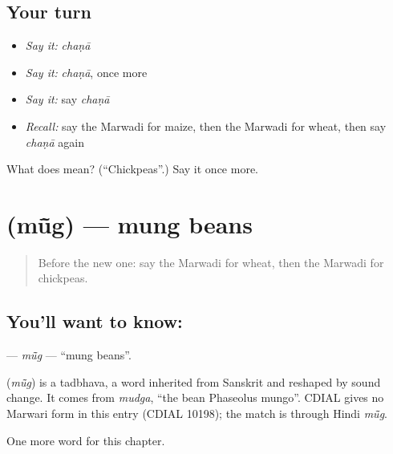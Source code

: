 \subsection*{Your turn}
\begin{itemize}
\raggedright
  \item \emph{Say it:} \emph{chaṇā}
  \item \emph{Say it:} \emph{chaṇā}, once more
  \item \emph{Say it:} say \emph{chaṇā}
  \item \emph{Recall:} say the Marwadi for maize, then the Marwadi for wheat, then say \emph{chaṇā} again
\end{itemize}

\begin{tcolorbox}[breakable,colback=teal!4,colframe=teal!35!black,title={Before you move on}]
What does  mean? (\textquotedblleft{}Chickpeas\textquotedblright{}.) Say it once more.
\end{tcolorbox}
\section[\texorpdfstring{\mw{मूंग} (mū̃g)}{मूंग (mū̃g)}]{ (mū̃g) — mung beans}

\label{lesson:MW-C133-mug}



\begin{quote}
Before the new one: say the Marwadi for wheat, then the Marwadi for chickpeas.
\end{quote}

\subsection*{You'll want to know: }
\textbf{} — \emph{mū̃g} — \textquotedblleft{}mung beans\textquotedblright{}.

\begin{cousinweb}
\textbf{} (\emph{mū̃g}) is a tadbhava, a word inherited from Sanskrit and reshaped by sound change. It comes from \emph{mudga}, \textquotedblleft{}the bean Phaseolus mungo\textquotedblright{}. CDIAL gives no Marwari form in this entry (CDIAL 10198); the match is through Hindi \emph{mū̃g}.
\end{cousinweb}

\begin{grammarlens}[title={What you've built}]
One more word for this chapter.
\end{grammarlens}

